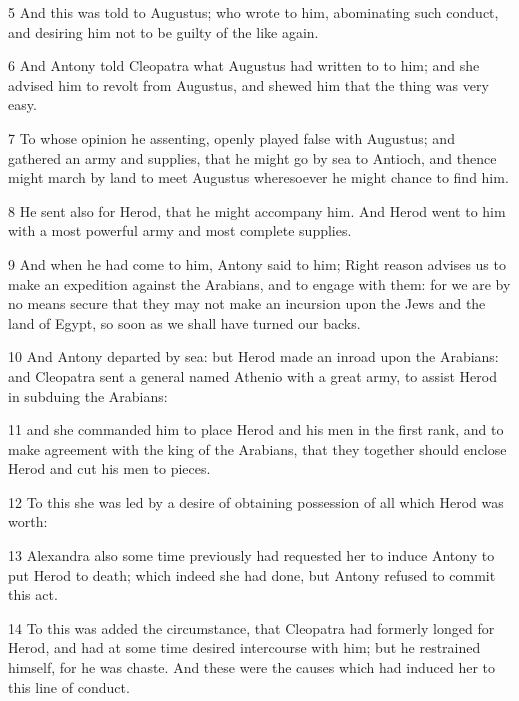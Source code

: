 \par 5 And this was told to Augustus; who wrote to him, abominating such conduct, and desiring him not to be guilty of the like again. 

\par 6 And Antony told Cleopatra what Augustus had written to to him; and she advised him to revolt from Augustus, and shewed him that the thing was very easy.

\par 7 To whose opinion he assenting, openly played false with Augustus; and gathered an army and supplies, that he might go by sea to Antioch, and thence might march by land to meet Augustus wheresoever he might chance to find him. 

\par 8 He sent also for Herod, that he might accompany him. And Herod went to him with a most powerful army and most complete supplies. 

\par 9 And when he had come to him, Antony said to him; Right reason advises us to make an expedition against the Arabians, and to engage with them: for we are by no means secure that they may not make an incursion upon the Jews and the land of Egypt, so soon as we shall have turned our backs. 

\par 10 And Antony departed by sea: but Herod made an inroad upon the Arabians: and Cleopatra sent a general named Athenio with a great army, to assist Herod in subduing the Arabians: 

\par 11 and she commanded him to place Herod and his men in the first rank, and to make agreement with the king of the Arabians, that they together should enclose Herod and cut his men to pieces. 

\par 12 To this she was led by a desire of obtaining possession of all which Herod was worth: 

\par 13 Alexandra also some time previously had requested her to induce Antony to put Herod to death; which indeed she had done, but Antony refused to commit this act. 

\par 14 To this was added the circumstance, that Cleopatra had formerly longed for Herod, and had at some time desired intercourse with him; but he restrained himself, for he was chaste. And these were the causes which had induced her to this line of conduct. 

